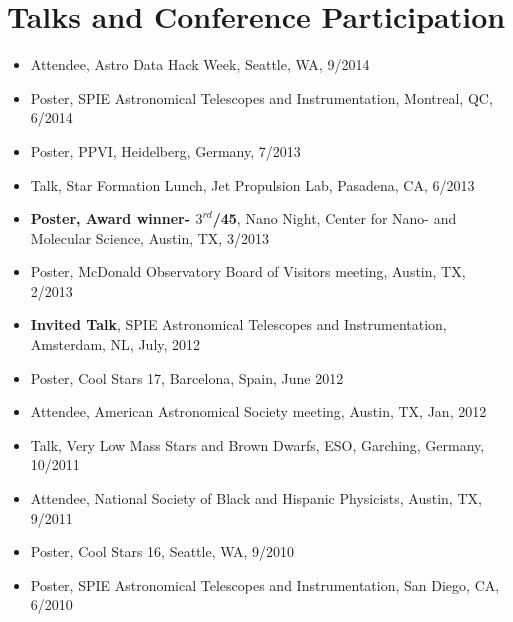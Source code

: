 \documentclass[10pt,letterpaper]{article}
\begin{document}



\section*{Talks and Conference Participation}

\begin{itemize}
    \item Attendee, Astro Data Hack Week, Seattle, WA, 9/2014
    \item Poster, SPIE Astronomical Telescopes and Instrumentation, Montreal, QC, 6/2014
    \item Poster, PPVI, Heidelberg, Germany, 7/2013
    \item Talk, Star Formation Lunch, Jet Propulsion Lab, Pasadena, CA, 6/2013
    \item \textbf{Poster, Award winner- $3^{rd}$/45}, Nano Night, Center for Nano- and Molecular Science, Austin, TX, 3/2013
    \item Poster, McDonald Observatory Board of Visitors meeting, Austin, TX, 2/2013 
    \item \textbf{Invited Talk}, SPIE Astronomical Telescopes and Instrumentation, Amsterdam, NL, July, 2012
    \item Poster, Cool Stars 17, Barcelona, Spain, June 2012
    \item Attendee, American Astronomical Society meeting, Austin, TX, Jan, 2012
    \item Talk, Very Low Mass Stars and Brown Dwarfs, ESO, Garching, Germany, 10/2011
    \item Attendee, National Society of Black and Hispanic Physicists, Austin, TX, 9/2011
    \item Poster, Cool Stars 16, Seattle, WA, 9/2010
    \item Poster, SPIE Astronomical Telescopes and Instrumentation, San Diego, CA, 6/2010
\end{itemize}
\end{document}
